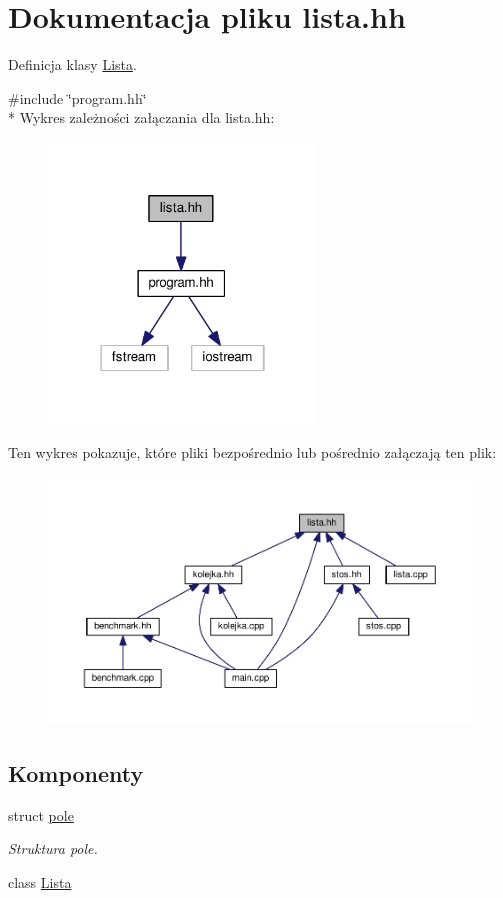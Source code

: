 \hypertarget{lista_8hh}{\section{Dokumentacja pliku lista.\-hh}
\label{lista_8hh}
}


Definicja klasy \hyperlink{class_lista}{Lista}.  


{\ttfamily \#include \char`\"{}program.\-hh\char`\"{}}\\*
Wykres zależności załączania dla lista.\-hh\-:\nopagebreak
\begin{figure}[H]
\begin{center}
\leavevmode
\includegraphics[width=202pt]{lista_8hh__incl}
\end{center}
\end{figure}
Ten wykres pokazuje, które pliki bezpośrednio lub pośrednio załączają ten plik\-:\nopagebreak
\begin{figure}[H]
\begin{center}
\leavevmode
\includegraphics[width=350pt]{lista_8hh__dep__incl}
\end{center}
\end{figure}
\subsection*{Komponenty}
\begin{DoxyCompactItemize}
\item 
struct \hyperlink{structpole}{pole}
\begin{DoxyCompactList}\small\item\em Struktura pole. \end{DoxyCompactList}\item 
class \hyperlink{class_lista}{Lista}
\end{DoxyCompactItemize}
